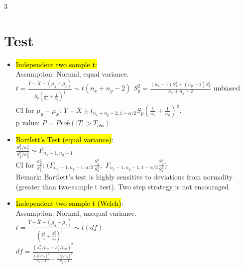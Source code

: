 \documentclass[a4paper,10pt]{article}
\begin{document}
\begin{multicols}{3}
\section*{Test}
\begin{itemize}
    \item \hl{Independent two sample t:}\\
    Assumption: Normal, equal variance.\\
    $t=\frac{\bar{Y}-\bar{X}-(\mu_y-\mu_x)}{S_p(\frac{1}{n_x}+\frac{1}{n_y})^\frac{1}{2}}\sim t(n_x+n_y-2)$
    $S_p^2=\frac{(n_x-1)S_x^2+(n_y-1)S_y^2}{n_x+n_y-2}$ unbiased\\
    CI for $\mu_y-\mu_x$: $\bar{Y}-\bar{X}\pm t_{n_x+n_y-2,1-\alpha/2}S_p(\frac{1}{n_x}+\frac{1}{n_y})^\frac{1}{2}$.\\
    p value: $P=Prob(|T|>T_{obs})$
    \item \hl{Bartlett's Test (equal variance)}:\\
    $\frac{S^2_x/\sigma^2_x}{S^2_y/\sigma^2_y}\sim F_{n_x-1,n_y-1}$\\
    CI for $\frac{\sigma^2_y}{\sigma^2_x}$: $(F_{n_x-1,n_y-1,\alpha/2}\frac{S^2_y}{S^2_x},$ $F_{n_x-1,n_y-1,1-\alpha/2}\frac{S^2_y}{S^2_x})$\\
    Remark: Bartlett's test is highly sensitive to deviations from normality (greater than two-sample t test). Two step strategy is not encouraged.
    \item \hl{Independent two sample t (Welch)}:\\
    Assumption: Normal, unequal variance.\\
    $t=\frac{\bar{Y}-\bar{X}-(\mu_y-\mu_x)}{(\frac{S_x^2}{n_x}+\frac{S_y^2}{n_y})^\frac{1}{2}} \sim t(df)$ \\$df=\frac{(s_x^2/n_x + s_y^2/n_y)^2}{\frac{(s_x^2/n_x)^2}{n_x - 1} + \frac{(s_y^2/n_y)^2}{n_y - 1}}$
    

\end{itemize}
\end{multicols}
\end{document}
